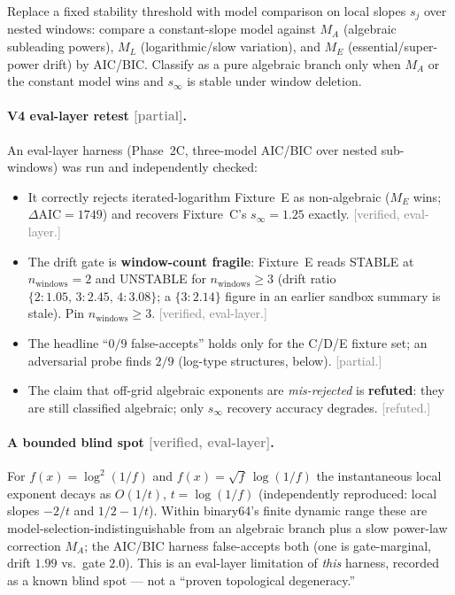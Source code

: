 \documentclass[11pt,a4paper]{article}
\newcommand{\status}[1]{\textcolor{gray}{\small\textsf{[#1]}}}
\begin{document}
Replace a fixed stability threshold with model comparison on local slopes $s_j$ over nested windows: compare a constant-slope model against $M_A$ (algebraic subleading powers), $M_L$ (logarithmic/slow variation), and $M_E$ (essential/super-power drift) by AIC/BIC. Classify as a pure algebraic branch only when $M_A$ or the constant model wins and $s_\infty$ is stable under window deletion.

\paragraph{V4 eval-layer retest \status{partial}.} An eval-layer harness (Phase~2C, three-model AIC/BIC over nested sub-windows) was run and independently checked:
\begin{itemize}
    \item It correctly rejects iterated-logarithm Fixture~E as non-algebraic ($M_E$ wins; $\Delta\mathrm{AIC}=1749$) and recovers Fixture~C's $s_\infty=1.25$ exactly. \status{verified, eval-layer.}
    \item The drift gate is \textbf{window-count fragile}: Fixture~E reads STABLE at $n_{\text{windows}}=2$ and UNSTABLE for $n_{\text{windows}}\ge3$ (drift ratio $\{2{:}1.05,\,3{:}2.45,\,4{:}3.08\}$; a $\{3{:}2.14\}$ figure in an earlier sandbox summary is stale). Pin $n_{\text{windows}}\ge3$. \status{verified, eval-layer.}
    \item The headline ``$0/9$ false-accepts'' holds only for the C/D/E fixture set; an adversarial probe finds $2/9$ (log-type structures, below). \status{partial.}
    \item The claim that off-grid algebraic exponents are \emph{mis-rejected} is \textbf{refuted}: they are still classified algebraic; only $s_\infty$ recovery accuracy degrades. \status{refuted.}
\end{itemize}

\paragraph{A bounded blind spot \status{verified, eval-layer}.} For $f(x)=\log^2(1/f)$ and $f(x)=\sqrt f\,\log(1/f)$ the instantaneous local exponent decays as $O(1/t)$, $t=\log(1/f)$ (independently reproduced: local slopes $-2/t$ and $1/2-1/t$). Within binary64's finite dynamic range these are model-selection-indistinguishable from an algebraic branch plus a slow power-law correction $M_A$; the AIC/BIC harness false-accepts both (one is gate-marginal, drift $1.99$ vs.\ gate $2.0$). This is an eval-layer limitation of \emph{this} harness, recorded as a known blind spot --- not a ``proven topological degeneracy.''
\end{document}
